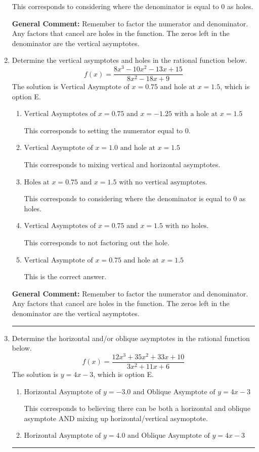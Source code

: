 \documentclass{extbook}[14pt]
\newcommand{\litem}[1]{\item #1

\rule{\textwidth}{0.4pt}}
\begin{document}
\begin{enumerate}
{\begin{enumerate}[label=\Alph*.]
This corresponds to considering where the denominator is equal to 0 as holes.
\end{enumerate}

\textbf{General Comment:} Remember to factor the numerator and denominator. Any factors that cancel are holes in the function. The zeros left in the denominator are the vertical asymptotes.
}
\litem{
Determine the vertical asymptotes and holes in the rational function below.
\[ f(x) = \frac{8x^{3} -10 x^{2} -13 x + 15}{8x^{2} -18 x + 9} \]The solution is \( \text{Vertical Asymptote of } x = 0.75 \text{ and hole at } x = 1.5 \), which is option E.\begin{enumerate}[label=\Alph*.]
\item \( \text{Vertical Asymptotes of } x = 0.75 \text{ and } x = -1.25 \text{ with a hole at } x = 1.5 \)

This corresponds to setting the numerator equal to 0.
\item \( \text{Vertical Asymptote of } x = 1.0 \text{ and hole at } x = 1.5 \)

This corresponds to mixing vertical and horizontal asymptotes.
\item \( \text{Holes at } x = 0.75 \text{ and } x = 1.5 \text{ with no vertical asymptotes.} \)

This corresponds to considering where the denominator is equal to 0 as holes.
\item \( \text{Vertical Asymptotes of } x = 0.75 \text{ and } x = 1.5 \text{ with no holes.} \)

This corresponds to not factoring out the hole.
\item \( \text{Vertical Asymptote of } x = 0.75 \text{ and hole at } x = 1.5 \)

This is the correct answer.
\end{enumerate}

\textbf{General Comment:} Remember to factor the numerator and denominator. Any factors that cancel are holes in the function. The zeros left in the denominator are the vertical asymptotes.
}
\litem{
Determine the horizontal and/or oblique asymptotes in the rational function below.
\[ f(x) = \frac{12x^{3} +35 x^{2} +33 x + 10}{3x^{2} +11 x + 6} \]The solution is \( y = 4x -3 \), which is option E.\begin{enumerate}[label=\Alph*.]
\item \( \text{Horizontal Asymptote of } y = -3.0 \text{ and Oblique Asymptote of } y = 4x -3 \)

This corresponds to believing there can be both a horizontal and oblique asymptote AND mixing up horizontal/vertical asymoptote.
\item \( \text{Horizontal Asymptote of } y = 4.0 \text{ and Oblique Asymptote of } y = 4x -3 \)


\end{enumerate}}
\end{enumerate}
\end{document}
